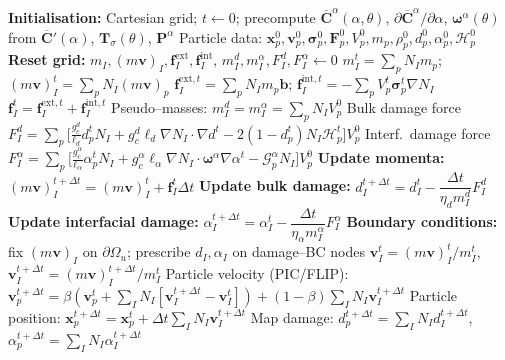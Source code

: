 \documentclass[12pt,a4paper]{article}
\newcommand{\bF}{\mathbf{F}}
\newcommand{\bsig}{\boldsymbol{\sigma}}
\newcommand{\beps}{\boldsymbol{\varepsilon}}
\newcommand{\bv}{\mathbf{v}}
\newcommand{\bb}{\mathbf{b}}
\newcommand{\bx}{\mathbf{x}}
\newcommand{\bP}{\mathbf{P}}
\newcommand{\bomega}{\boldsymbol{\omega}}
\newcommand{\Ca}{\overline{\mathbf{C}}^{\alpha}}     %
\newcommand{\Cp}{\overline{\mathbf{C}}'}             %
\newcommand{\Tsig}{\mathbf{T}_{\!\sigma}}            %
\newcommand{\Dt}{\Delta t}
\begin{document}
	\begin{algorithm}[H]
		\caption{Explicit USL--MPM with two--field anisotropic phase--field fracture}
		\label{alg:uslmpm_pf2}
		\begin{algorithmic}[1]
			\State \textbf{Initialisation:} Cartesian grid; $t\!\leftarrow\!0$; precompute
			$\Ca(\alpha,\theta)$, $\partial\Ca/\partial\alpha$, $\bomega^{\alpha}(\theta)$ from
			$\Cp(\alpha)$, $\Tsig(\theta)$, $\bP^{\alpha}$ 
			\State Particle data: $\bx_p^0,\bv_p^0,\bsig_p^0,\bF_p^0,V_p^0,m_p,\rho_p^0,d_p^0,\alpha_p^0,\mathcal{H}_p^0$
				\State \textbf{Reset grid:} $m_I,(m\bv)_I,\mathbf{f}_I^{\mathrm{ext}},\mathbf{f}_I^{\mathrm{int}},\,m_I^{d},m_I^{\alpha},F_I^{d},F_I^{\alpha}\leftarrow 0$
					\State $m_I^{t}=\sum_p N_I m_p$;\quad $(m\bv)_I^{t}=\sum_p N_I (m\bv)_p$
					\State $\mathbf{f}_I^{\mathrm{ext},t}=\sum_p N_I m_p\bb$;\quad
					$\mathbf{f}_I^{\mathrm{int},t}=-\sum_p V_p^{t}\bsig_p^{t}\nabla N_I$ \Comment{$\bsig_p^t=g(d_p^t)\Ca(\alpha_p^t)\!:\!\beps_p^t$}
					\State $\mathbf{f}_I^{t}=\mathbf{f}_I^{\mathrm{ext},t}+\mathbf{f}_I^{\mathrm{int},t}$
					\State Pseudo--masses: $m_I^{d}=m_I^{\alpha}=\sum_p N_I V_p^0$
					\State Bulk damage force $F_I^{d}=\sum_p\bigl[\tfrac{g_c^{d}}{\ell_d}d_p^t N_I+g_c^{d}\ell_d\nabla N_I\!\cdot\!\nabla d^t-2(1-d_p^t)N_I\mathcal{H}_p^t\bigr]V_p^0$
					\State Interf.\ damage force $F_I^{\alpha}=\sum_p\bigl[\tfrac{g_c^{\alpha}}{\ell_\alpha}\alpha_p^t N_I+g_c^{\alpha}\ell_\alpha\nabla N_I\!\cdot\!\bomega^{\alpha}\nabla\alpha^t-\mathcal{G}^{\alpha}_p N_I\bigr]V_p^0$
				\EndPhase
				\State \textbf{Update momenta:} $(m\bv)_I^{t+\Dt}=(m\bv)_I^{t}+\mathbf{f}_I^{t}\Dt$
				\State \textbf{Update bulk damage:} $d_I^{t+\Dt}=d_I^{t}-\dfrac{\Dt}{\eta_d m_I^{d}}F_I^{d}$
				\State \textbf{Update interfacial damage:} $\alpha_I^{t+\Dt}=\alpha_I^{t}-\dfrac{\Dt}{\eta_\alpha m_I^{\alpha}}F_I^{\alpha}$
				\State \textbf{Boundary conditions:} fix $(m\bv)_I$ on $\partial\Omega_u$; prescribe $d_I,\alpha_I$ on damage--BC nodes
					\State $\bv_I^{t}=(m\bv)_I^{t}/m_I^{t}$,\quad $\bv_I^{t+\Dt}=(m\bv)_I^{t+\Dt}/m_I^{t}$
					\State Particle velocity (PIC/FLIP): $\bv_p^{t+\Dt}=\beta(\bv_p^{t}+\sum_I N_I[\bv_I^{t+\Dt}-\bv_I^{t}])+(1-\beta)\sum_I N_I\bv_I^{t+\Dt}$
					\State Particle position: $\bx_p^{t+\Dt}=\bx_p^{t}+\Dt\sum_I N_I\bv_I^{t+\Dt}$
					\State Map damage: $d_p^{t+\Dt}=\sum_I N_I d_I^{t+\Dt}$,\quad $\alpha_p^{t+\Dt}=\sum_I N_I\alpha_I^{t+\Dt}$

\end{algorithmic}
\end{algorithm}
\end{document}
